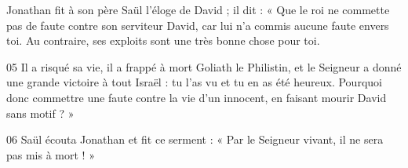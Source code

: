 Jonathan fit à son père Saül l’éloge de David ; il dit : « Que le roi ne commette pas de faute contre son serviteur David, car lui n’a commis aucune faute envers toi. Au contraire, ses exploits sont une très bonne chose pour toi.

05 Il a risqué sa vie, il a frappé à mort Goliath le Philistin, et le Seigneur a donné une grande victoire à tout Israël : tu l’as vu et tu en as été heureux. Pourquoi donc commettre une faute contre la vie d’un innocent, en faisant mourir David sans motif ? »

06 Saül écouta Jonathan et fit ce serment : « Par le Seigneur vivant, il ne sera pas mis à mort ! »